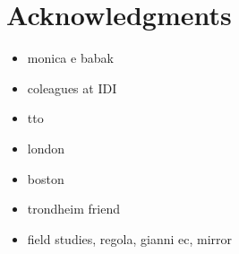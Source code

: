 \chapter{Acknowledgments}

\begin{itemize}
\itemsep1pt\parskip0pt
\item
  monica e babak
\item
  coleagues at IDI
\item
  tto
\item
  london
\item
  boston
\item
  trondheim friend
\item
  field studies, regola, gianni ec, mirror
\end{itemize}
